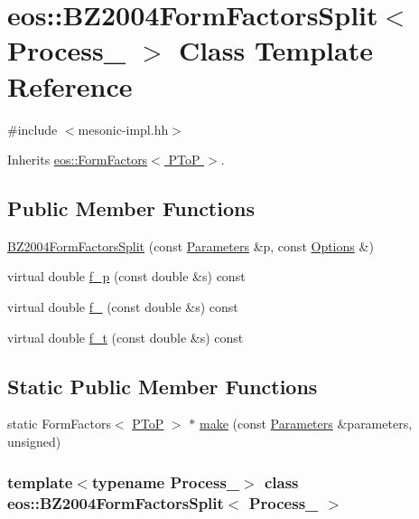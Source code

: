 \hypertarget{classeos_1_1BZ2004FormFactorsSplit}{
\section{eos::BZ2004FormFactorsSplit$<$ Process\_\- $>$ Class Template Reference}
\label{classeos_1_1BZ2004FormFactorsSplit}
}


{\ttfamily \#include $<$mesonic-\/impl.hh$>$}

Inherits \hyperlink{classeos_1_1FormFactors_3_01PToP_01_4}{eos::FormFactors$<$ PToP $>$}.\subsection*{Public Member Functions}
\begin{DoxyCompactItemize}
\item 
\hyperlink{classeos_1_1BZ2004FormFactorsSplit_a2931b80b68b116f4f51c966649421286}{BZ2004FormFactorsSplit} (const \hyperlink{classeos_1_1Parameters}{Parameters} \&p, const \hyperlink{classeos_1_1Options}{Options} \&)
\item 
virtual double \hyperlink{classeos_1_1BZ2004FormFactorsSplit_a58d02490b96eaea8923e8252205ec60a}{f\_\-p} (const double \&s) const 
\item 
virtual double \hyperlink{classeos_1_1BZ2004FormFactorsSplit_a4963dfd717bb53dcb1093535a6697e89}{f\_} (const double \&s) const 
\item 
virtual double \hyperlink{classeos_1_1BZ2004FormFactorsSplit_a395cb136ff1d486d5a0b0a2c0d5f7d10}{f\_\-t} (const double \&s) const 
\end{DoxyCompactItemize}
\subsection*{Static Public Member Functions}
\begin{DoxyCompactItemize}
\item 
static FormFactors$<$ \hyperlink{structeos_1_1PToP}{PToP} $>$ $\ast$ \hyperlink{classeos_1_1BZ2004FormFactorsSplit_a84eed9e4957fc8fedcb5f116abf40838}{make} (const \hyperlink{classeos_1_1Parameters}{Parameters} \&parameters, unsigned)
\end{DoxyCompactItemize}
\subsubsection*{template$<$typename Process\_\-$>$ class eos::BZ2004FormFactorsSplit$<$ Process\_\- $>$}



